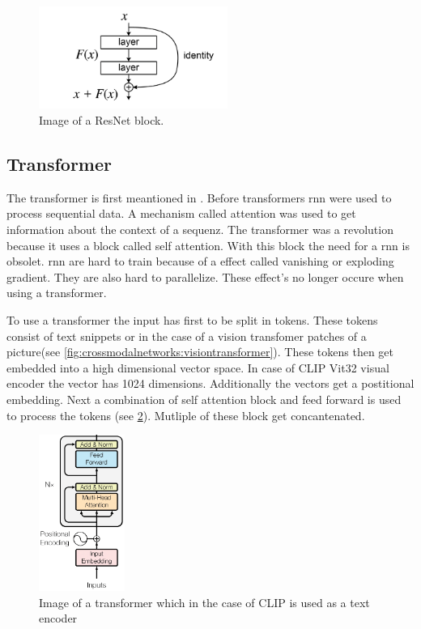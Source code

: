     \begin{figure}[h]
        \centering
        \includegraphics[width=0.55\textwidth]{Images/crossmodalnetworks/ResBlock.png}
        \caption{Image of a ResNet block.\cite{resnetpaper}}
        \label{fig:crossmodalnetworks:resblock}
    \end{figure}

    \subsection{Transformer}

    The transformer is first meantioned in \cite{attentionisallyouneed}.
    Before transformers \acrfull{rnn} were used to process sequential data.
    A mechanism called attention was used to get information about the context of a sequenz.
    The transformer was a revolution because it uses a  block called self attention.
    With this block the need for a \acrshort{rnn} is obsolet.
    \acrshort{rnn} are hard to train because of a effect called vanishing or exploding gradient.
    They are also hard to parallelize.
    These effect's no longer occure when using a transformer.


    To use a transformer the input has first to be split in tokens.
    These tokens consist of text snippets or in the case of a vision transfomer patches of a picture(see \cref{fig:crossmodalnetworks:visiontransformer}).
    These tokens then get embedded into a high dimensional vector space.
    In case of CLIP Vit32 visual encoder the vector has 1024 dimensions.
    Additionally the vectors get a postitional embedding.
    Next a combination of self attention block and feed forward is used to process the tokens (see \cref{fig:crossmodalnetworks:transformer}).
    Mutliple of these block get concantenated.

    \begin{figure}[]
        \centering
        \includegraphics[width=0.25\textwidth]{Images/crossmodalnetworks/The-Transformer-encoder-structure.png}
        \caption{Image of a transformer which in the case of CLIP is used as a text encoder\cite{fig:encoder}}
        \label{fig:crossmodalnetworks:transformer}
    \end{figure}

